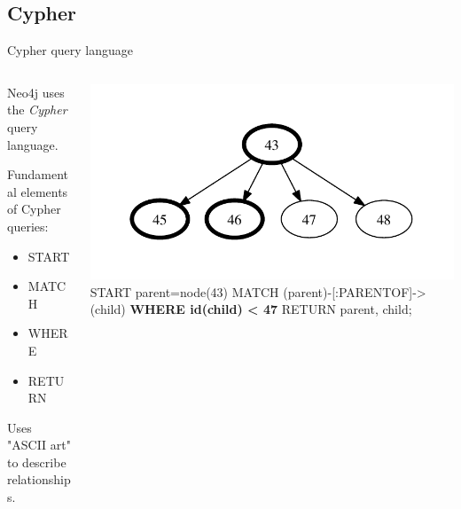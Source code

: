 \documentclass{beamer}
\newcommand{\linespace}{\vskip 0.25cm}
\begin{document}
\subsection{Cypher}

\begin{frame}{Cypher query language}
	\begin{columns}
		\begin{column}{0.4\textwidth}
			Neo4j uses the \emph{Cypher} query language.

			\linespace
			
			Fundamental elements of Cypher queries:
		\begin{itemize}
			\item START
			\item MATCH
			\item WHERE
			\item RETURN
		\end{itemize}
		
		\linespace
		
		Uses "ASCII art" to describe relationships.
	\end{column}
	\begin{column}{0.60\textwidth}

	\includegraphics[width=.95\textwidth]{Figures/parents.pdf}
	\linebreak
	{
START parent=node(43)
\linebreak
MATCH (parent)-[:PARENTOF]->(child)
\linebreak
\textbf{WHERE id(child) < 47}
\linebreak
RETURN parent, child;
}

	\end{column}	
	\end{columns}
\end{frame}
\end{document}
